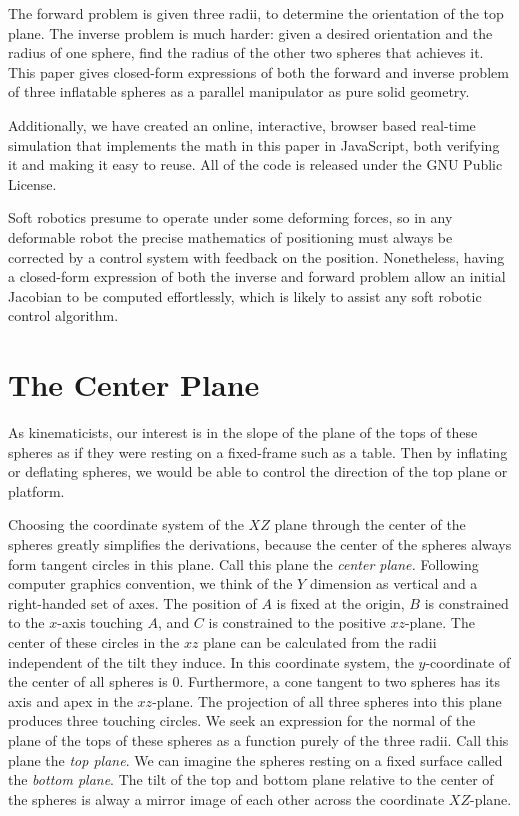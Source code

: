 \documentclass{article}
\begin{document}
The forward problem is given three radii,
to determine the orientation of the top plane.
The inverse problem is much harder: given a desired orientation and the radius of one
sphere, find the radius of the other two spheres that achieves it.
This paper gives closed-form expressions of both
the forward and inverse problem of three inflatable spheres as a parallel manipulator as pure solid geometry.

Additionally, we have created an online, interactive, browser based real-time simulation\cite{softrobotcalc} that implements
the math in this paper in JavaScript, both verifying it and making it easy to reuse.
All of the code is released under the GNU Public License\cite{gplv3}.

Soft robotics presume to operate under some deforming forces, so in any deformable robot the precise mathematics
of positioning must always be corrected by a control system with feedback on the position.
Nonetheless, having a closed-form expression of both the inverse and forward problem allow
an initial Jacobian to be computed effortlessly, which is likely to assist any soft robotic control algorithm.

\section{The Center Plane}

As kinematicists,
our interest is in the slope of the plane of the tops of these spheres
as if they were resting on a fixed-frame such as a table. Then by inflating or deflating spheres,
we would be able to control the direction of the top plane or platform.

Choosing the coordinate system of the $XZ$ plane through the center of the spheres greatly
simplifies the derivations, because the center of the spheres always form tangent circles
in this plane. Call this plane the {\em center plane.}
Following computer graphics convention, we think of the $Y$ dimension as vertical and a
right-handed set of axes.
The position of $A$ is fixed at the origin, $B$ is constrained to the $x$-axis touching $A$, and
$C$ is constrained to the positive $xz$-plane. The center of these circles in the $xz$ plane can be
calculated from the radii independent of the tilt they induce.
In this coordinate system, the $y$-coordinate of the center of all spheres is $0$.
Furthermore, a cone tangent to two spheres has its axis and apex in the $xz$-plane.
The projection of all three spheres into this plane produces three touching circles.
We seek an expression for the normal of the plane of the tops of these spheres as a function
purely of the three radii. Call this plane the {\em top plane}.
We can imagine the spheres resting on a fixed surface called the {\em bottom plane}.
The tilt of the top and bottom plane relative to the center of the spheres
is alway a mirror image of each other across the coordinate $XZ$-plane.
\end{document}
